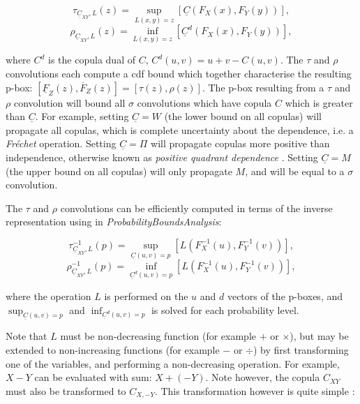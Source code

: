 \documentclass{juliacon}
\begin{document}
\begin{equation*}\label{taupbox}
  \tau_{\underline{C}_{XY},L}(z) = \sup_{L(x,y)=z} [\underline{C}(F_{X}(x), F_Y(y))],
\end{equation*}
\begin{equation*}\label{rhopbox}
  \rho_{\underline{C}_{XY},L}(z) = \inf_{L(x,y)=z} [\underline{C}^d(F_{X}(x), F_Y(y))],
\end{equation*}

where $C^d$ is the copula dual of $C$, $C^d(u,v) = u + v - C(u,v)$. The $\tau$ and $\rho$ convolutions each compute a cdf bound which together characterise the resulting p-box: $[\underline{F}_{Z}(z), \overline{F}_{Z}(z)] = [\tau(z), \rho(z)]$. The p-box resulting from a $\tau$ and $\rho$ convolution will bound all $\sigma$ convolutions which have copula $C$ which is greater than $\underline{C}$. For example, setting $\underline{C} = W$ (the lower bound on all copulas) will propagate all copulas, which is complete uncertainty about the dependence, i.e. a \textit{Fréchet} operation. Setting $\underline{C} = \Pi$ will propagate copulas more positive than independence, otherwise known as \textit{positive quadrant dependence} \cite{nelsen2007introduction}. Setting $\underline{C} = M$ (the upper bound on all copulas) will only propagate $M$, and will be equal to a $\sigma$ convolution. 

The $\tau$ and $\rho$ convolutions can be efficiently computed in terms of the inverse representation using in \textit{ProbabilityBoundsAnalysis}: 

\begin{equation*}\label{taupbox2}
  \tau^{-1}_{\underline{C}_{XY},L}(p) = \sup_{\underline{C}(u,v) = p} [L(F^{-1}_{X}(u), F^{-1}_Y(v))],
\end{equation*}
\begin{equation*}\label{rhopbox2}
  \rho^{-1}_{\underline{C}_{XY},L}(p) = \inf_{\underline{C}^{d}(u,v) = p} [L(F^{-1}_{X}(u), F^{-1}_Y(v))],
\end{equation*}

where the operation $L$ is performed on the $u$ and $d$ vectors of the p-boxes, and $\sup_{\underline{C}(u,v) = p}$ and $\inf_{\underline{C}^{d}(u,v) = p}$ is solved for each probability level.

Note that $L$ must be non-decreasing function (for example $+$ or $\times$), but may be extended to non-increasing functions (for example $-$ or $\div$) by first transforming one of the variables, and performing a non-decreasing operation. For example, $X - Y$ can be evaluated with sum: $X + (-Y)$. Note however, the copula $C_{XY}$ must also be transformed to $C_{X,-Y}$. This transformation however is quite simple \cite{nelsen2007introduction}: 
\end{document}
